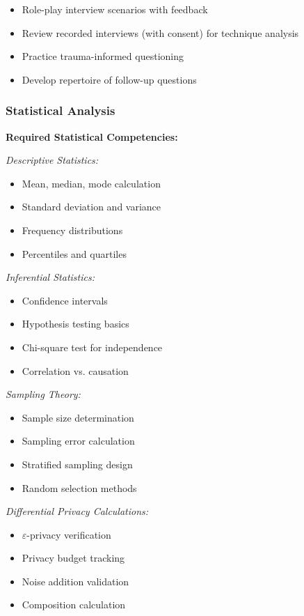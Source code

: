 \documentclass[11pt,a4paper]{article}
\begin{document}
\begin{itemize}
\item Role-play interview scenarios with feedback
\item Review recorded interviews (with consent) for technique analysis
\item Practice trauma-informed questioning
\item Develop repertoire of follow-up questions
\end{itemize}

\subsubsection{Statistical Analysis}

\textbf{Required Statistical Competencies:}

\textit{Descriptive Statistics:}
\begin{itemize}
\item Mean, median, mode calculation
\item Standard deviation and variance
\item Frequency distributions
\item Percentiles and quartiles
\end{itemize}

\textit{Inferential Statistics:}
\begin{itemize}
\item Confidence intervals
\item Hypothesis testing basics
\item Chi-square test for independence
\item Correlation vs. causation
\end{itemize}

\textit{Sampling Theory:}
\begin{itemize}
\item Sample size determination
\item Sampling error calculation
\item Stratified sampling design
\item Random selection methods
\end{itemize}

\textit{Differential Privacy Calculations:}
\begin{itemize}
\item $\varepsilon$-privacy verification
\item Privacy budget tracking
\item Noise addition validation
\item Composition calculation
\end{itemize}
\end{document}
